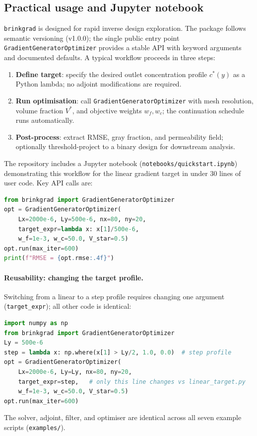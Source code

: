 \subsection{Practical usage and Jupyter notebook}
\label{sec:practical}
\texttt{brinkgrad} is designed for rapid inverse design exploration.
The package follows semantic versioning (v1.0.0);
the single public entry point \texttt{GradientGeneratorOptimizer}
provides a stable API with keyword arguments and documented defaults.
A typical workflow proceeds in three steps:
\begin{enumerate}\itemsep2pt
    \item \textbf{Define target}: specify the desired outlet
          concentration profile $c^*(y)$ as a Python lambda;
          no adjoint modifications are required.
    \item \textbf{Run optimisation}: call
          \texttt{GradientGeneratorOptimizer} with mesh resolution,
          volume fraction $V^*$, and objective weights $w_f, w_c$;
          the continuation schedule runs automatically.
    \item \textbf{Post-process}: extract RMSE, gray fraction,
          and permeability field; optionally threshold-project
          to a binary design for downstream analysis.
\end{enumerate}
The repository includes a Jupyter notebook
(\texttt{notebooks/quickstart.ipynb}) demonstrating this workflow
for the linear gradient target in under 30 lines of user code.
Key API calls are:
\begin{lstlisting}[language=Python,breaklines=true]
from brinkgrad import GradientGeneratorOptimizer
opt = GradientGeneratorOptimizer(
    Lx=2000e-6, Ly=500e-6, nx=80, ny=20,
    target_expr=lambda x: x[1]/500e-6,
    w_f=1e-3, w_c=50.0, V_star=0.5)
opt.run(max_iter=600)
print(f"RMSE = {opt.rmse:.4f}")
\end{lstlisting}

\paragraph{Reusability: changing the target profile.}
Switching from a linear to a step profile requires changing
one argument (\texttt{target\_expr}); all other code is identical:
\begin{lstlisting}[language=Python,breaklines=true]
import numpy as np
from brinkgrad import GradientGeneratorOptimizer
Ly = 500e-6
step = lambda x: np.where(x[1] > Ly/2, 1.0, 0.0)  # step profile
opt = GradientGeneratorOptimizer(
    Lx=2000e-6, Ly=Ly, nx=80, ny=20,
    target_expr=step,   # only this line changes vs linear_target.py
    w_f=1e-3, w_c=50.0, V_star=0.5)
opt.run(max_iter=600)
\end{lstlisting}
The solver, adjoint, filter, and optimiser are identical
across all seven example scripts (\texttt{examples/}).

